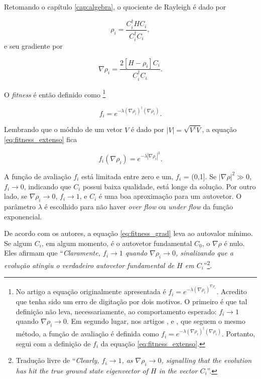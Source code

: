 	Retomando o capítulo \ref{cap:algebra}, o quociente de Rayleigh é dado por
	
	\begin{equation}\label{eq:rho-GA}
		\rho_i = \frac{C_i^\dagger H C_i}{C_i^\dagger C_i},
	\end{equation}
	e seu gradiente por
	
	\begin{equation}\label{eq:grad_rho_metodo}
		\nabla \rho_i = \frac{2[H - \rho_i]C_i}{C_i^\dagger C_i}.
	\end{equation}
		
	O \emph{fitness} é então definido como \footnote{
		No artigo \cite{metodo2004} a equação originalmente apresentada é $f_i = e^{-\lambda (\nabla \rho_i)^{\nabla \rho_i}}$. Acredito que tenha sido um erro de digitação por dois motivos. O primeiro é que tal definição não leva, necessariamente, ao comportamento esperado: $f_i \rightarrow 1$ quando $\nabla \rho_i \rightarrow 0$. Em segundo lugar, nos artigos \cite{metodo2006},  \cite{metodo2008} e \cite{metodo2009}, que seguem o mesmo método, a função de avaliação é definida como $f_i = e^{-\lambda (\nabla \rho_i)^{\dagger} (\nabla \rho_i)}$. Portanto, segui com a definição de $f_i$ da equação \ref{eq:fitness_extenso}.}
	
	\begin{equation}\label{eq:fitness_extenso}
		f_i = e^{-\lambda (\nabla \rho_i)^\dagger (\nabla \rho_i)}.
	\end{equation}
	
	Lembrando que o módulo de um vetor $V$ é dado por $|V| = \sqrt{V^{\dagger} V}$, a equação \ref{eq:fitness_extenso} fica
	
	\begin{equation}\label{eq:fitness_grad}
		f_i(\nabla \rho_i) = e^{-\lambda |\nabla \rho_i|^2}.
	\end{equation}
			 
	A função de avaliação $f_i$ está limitada entre zero e um, $f_i$ = (0,1]. Se $|\nabla \rho|^2 \gg 0$, $f_i \rightarrow 0$, indicando que $C_i$ possui baixa qualidade, está longe da solução. Por outro lado, se $\nabla \rho_i \rightarrow 0 $, $f_i \rightarrow 1$, e $C_i$ é uma boa aproximação para um autovetor. O parâmetro $\lambda$ é escolhido para não haver \emph{over flow} ou \emph{under flow} da função exponencial.
	
	De acordo com os autores, a equação \ref{eq:fitness_grad} leva ao autovalor mínimo. Se algum $C_i$, em algum momento, é o autovetor fundamental $C_0$, o $\nabla \rho$ é nulo. Eles afirmam que ``\textit{Claramente, $f_i \rightarrow 1$ quando $\nabla \rho_i \rightarrow 0$, sinalizando que a evolução atingiu o verdadeiro autovetor fundamental de $H$ em $C_i$}''\footnote{Tradução livre de ``\textit{Clearly, $f_i \rightarrow 1$, as $\nabla \rho_i \rightarrow 0$, signalling that the evolution has hit the true ground state eigenvector of $H$ in the vector $C_i$}''.}. 
	
